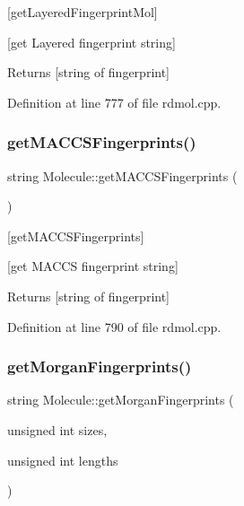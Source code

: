 \mbox{[}get\+Layered\+Fingerprint\+Mol\mbox{]} 

\mbox{[}get Layered fingerprint string\mbox{]}

\begin{DoxyReturn}{Returns}
\mbox{[}string of fingerprint\mbox{]} 
\end{DoxyReturn}


Definition at line 777 of file rdmol.\+cpp.

\mbox{\label{class_molecule_ae3c52fdc38e787ce7abb9ec4fb35795c}} 
\subsubsection{\texorpdfstring{get\+M\+A\+C\+C\+S\+Fingerprints()}{getMACCSFingerprints()}}
{\footnotesize\ttfamily string Molecule\+::get\+M\+A\+C\+C\+S\+Fingerprints (\begin{DoxyParamCaption}{ }\end{DoxyParamCaption})}



\mbox{[}get\+M\+A\+C\+C\+S\+Fingerprints\mbox{]} 

\mbox{[}get M\+A\+C\+CS fingerprint string\mbox{]}

\begin{DoxyReturn}{Returns}
\mbox{[}string of fingerprint\mbox{]} 
\end{DoxyReturn}


Definition at line 790 of file rdmol.\+cpp.

\mbox{\label{class_molecule_a78cd64d263c131ee0313917c023b940f}} 
\subsubsection{\texorpdfstring{get\+Morgan\+Fingerprints()}{getMorganFingerprints()}}
{\footnotesize\ttfamily string Molecule\+::get\+Morgan\+Fingerprints (\begin{DoxyParamCaption}\item[{unsigned int}]{sizes,  }\item[{unsigned int}]{lengths }\end{DoxyParamCaption})}



